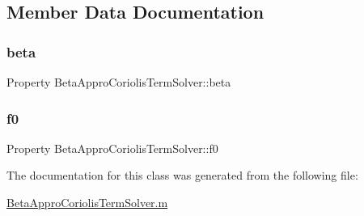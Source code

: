 \subsection{Member Data Documentation}
\mbox{\label{class_beta_appro_coriolis_term_solver_a417829f69185f320ccde4d4695a24366}} 
\subsubsection{\texorpdfstring{beta}{beta}}
{\footnotesize\ttfamily Property Beta\+Appro\+Coriolis\+Term\+Solver\+::beta}

\mbox{\label{class_beta_appro_coriolis_term_solver_a78d8ba5f989c047c9abf9f292df8411e}} 
\subsubsection{\texorpdfstring{f0}{f0}}
{\footnotesize\ttfamily Property Beta\+Appro\+Coriolis\+Term\+Solver\+::f0}



The documentation for this class was generated from the following file\+:\begin{DoxyCompactItemize}
\item 
\hyperlink{_beta_appro_coriolis_term_solver_8m}{Beta\+Appro\+Coriolis\+Term\+Solver.\+m}\end{DoxyCompactItemize}

